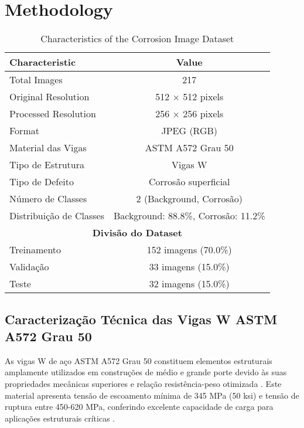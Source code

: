 \documentclass[12pt,a4paper,twoside]{article}
\begin{document}
\section{Methodology}

\begin{table}[htbp]
\centering
\caption{Characteristics of the Corrosion Image Dataset}
\label{tab:dataset_caracteristicas}
\begin{tabular}{|l|c|}
\hline
\textbf{Characteristic} & \textbf{Value} \\
\hline
Total Images & 217 \\
\hline
Original Resolution & 512 × 512 pixels \\
\hline
Processed Resolution & 256 × 256 pixels \\
\hline
Format & JPEG (RGB) \\
\hline
Material das Vigas & ASTM A572 Grau 50 \\
\hline
Tipo de Estrutura & Vigas W \\
\hline
Tipo de Defeito & Corrosão superficial \\
\hline
Número de Classes & 2 (Background, Corrosão) \\
\hline
Distribuição de Classes & Background: 88.8\%, Corrosão: 11.2\% \\
\hline
\multicolumn{2}{|c|}{\textbf{Divisão do Dataset}} \\
\hline
Treinamento & 152 imagens (70.0\%) \\
\hline
Validação & 33 imagens (15.0\%) \\
\hline
Teste & 32 imagens (15.0\%) \\
\hline
\end{tabular}
\end{table}


\label{sec:metodologia}

\subsection{Caracterização Técnica das Vigas W ASTM A572 Grau 50}
\label{subsec:caracterizacao_material}

As vigas W de aço ASTM A572 Grau 50 constituem elementos estruturais amplamente utilizados em construções de médio e grande porte devido às suas propriedades mecânicas superiores e relação resistência-peso otimizada \cite{astm2018a572}. Este material apresenta tensão de escoamento mínima de 345 MPa (50 ksi) e tensão de ruptura entre 450-620 MPa, conferindo excelente capacidade de carga para aplicações estruturais críticas \cite{aisc2016specification}.
\end{document}
